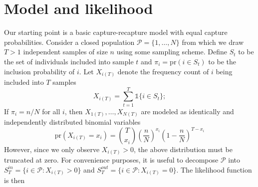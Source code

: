 \documentclass[manuscript]{biometrika}
\begin{document}
\section{Model and likelihood}
Our starting point is a basic capture-recapture model with equal capture probabilities. Consider a closed population $\mathcal{P} = \{1,\ldots,N\}$ from which we draw $T > 1$ independent samples of size $n$ using some sampling scheme. Define $S_t$ to be the set of individuals included into sample $t$ and $\pi_i = \text{pr}(i \in S_t)$ to be the inclusion probability of $i$. Let $X_{i(T)}$ denote the frequency count of $i$ being included into $T$ samples
\begin{equation*}
X_{i(T)} = \sum_{t=1}^T \mathds{1}\{i \in S_t\};
\end{equation*}
If $\pi_i = n / N$ for all $i$, then $X_{1(T)}, \ldots, X_{N(T)}$ are modeled as identically and independently distributed binomial variables
\begin{equation*}
\text{pr}(X_{i(T)} = x_i) = \binom{T}{x_i} \left(\frac{n}{N}\right)^{x_i} \left(1 - \frac{n}{N}\right)^{T - x_i}
\end{equation*}
However, since we only observe $X_{i(T)} > 0$, the above distribution must be truncated at zero. For convenience purposes, it is useful to decompose $\mathcal{P}$ into $S^{in}_T = \{i \in \mathcal{P}: X_{i(T)} > 0\}$ and $S^{out}_T = \{i \in \mathcal{P}: X_{i(T)} = 0\}$. The likelihood function is then
\end{document}
